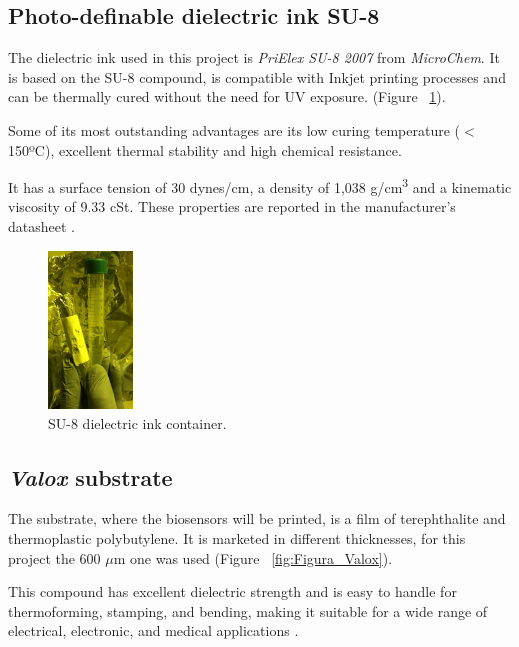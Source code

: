 \subsection{Photo-definable dielectric ink SU-8}
The dielectric ink used in this project is \emph{PriElex SU-8 2007} from \emph{MicroChem}. It is based on the SU-8 compound, is compatible with Inkjet printing processes and can be thermally cured without the need for UV exposure. (Figure ~\ref{fig:Figura_tinta_SU8}).

Some of its most outstanding advantages are its low curing temperature ($<$ 150ºC), excellent thermal stability and high chemical resistance.

It has a surface tension of 30 dynes/cm, a density of 1,038 g/cm\textsuperscript{3} and a kinematic viscosity of 9.33 cSt. These properties are reported in the manufacturer's datasheet \cite{PriElexSU8}.

\begin{figure}[H]
  \centering
    \includegraphics[width=0.2\textwidth]{Figures/Figura_tinta_SU8}
  \caption{SU-8 dielectric ink container.}
  \label{fig:Figura_tinta_SU8}
\end{figure}

\subsection{\textit{Valox} substrate}
The substrate, where the biosensors will be printed, is a film of terephthalite and thermoplastic polybutylene. It is marketed in different thicknesses, for this project the 600 $\mu$m one was used (Figure ~\ref{fig:Figura_Valox}).

This compound has excellent dielectric strength and is easy to handle for thermoforming, stamping, and bending, making it suitable for a wide range of electrical, electronic, and medical applications \cite{Valox}.

